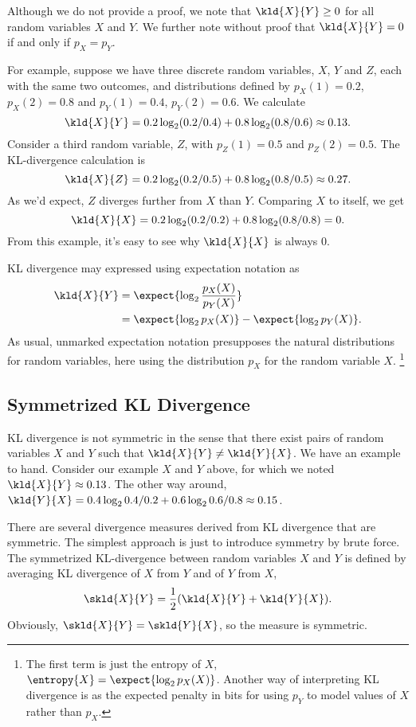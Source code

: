Although we do not provide a proof, we note that $\kld{X}{Y} \geq 0$
for all random variables $X$ and $Y$.  We further note without proof
that $\kld{X}{Y} = 0$ if and only if $p_X = p_Y$.

For example, suppose we have three discrete random variables, $X$, $Y$
and $Z$, each with the same two outcomes, and distributions defined by
$p_X(1) = 0.2$, $p_X(2) = 0.8$ and $p_Y(1) = 0.4$, $p_Y(2) = 0.6$.  We
calculate 
%
\[
\kld{X}{Y} = 0.2 \log_2 (0.2/0.4) + 0.8 \log_2 (0.8/0.6) \approx 0.13.
\]
%
Consider a third random variable, $Z$, with $p_Z(1) = 0.5$ and
$p_Z(2) = 0.5$.  The KL-divergence calculation is 
%
\[
\kld{X}{Z} = 0.2 \log_2 (0.2/0.5) + 0.8 \log_2 (0.8/0.5) \approx 0.27.
\]
As we'd expect, $Z$ diverges further from $X$ than $Y$.  
Comparing $X$ to itself, we get
%
\[
\kld{X}{X} = 0.2 \log_2 (0.2/0.2) + 0.8 \log_2(0.8/0.8) = 0.
\]  
%
From this example, it's easy to see why $\kld{X}{X}$ is always 0.

KL divergence may expressed using expectation notation as
%
\begin{align}
\kld{X}{Y} 
&= \expect{\log_2 \frac{p_X(X)}{p_Y(X)}}
\\
&= \expect{\log_2 p_X(X)} - \expect{\log_2 p_Y(X)}.
\end{align}
%
As usual, unmarked expectation notation presupposes the natural
distributions for random variables, here using the distribution $p_X$
for the random variable $X$.%
%
\footnote{The first term is just the entropy of $X$,
$\entropy{X} = \expect{\log_2 p_X(X)}$.  Another way of interpreting
KL divergence is as the expected penalty in bits for using $p_Y$ to
model values of $X$ rather than $p_X$.}

\subsection{Symmetrized KL Divergence}\label{section:stats-symmetrized-kl-divergence}

KL divergence is not symmetric in the sense that there exist pairs of
random variables $X$ and $Y$ such that $\kld{X}{Y} \neq \kld{Y}{X}$.
We have an example to hand.  Consider our example $X$ and $Y$ above,
for which we noted $\kld{X}{Y} \approx 0.13$.  The other way around,
$\kld{Y}{X} = 0.4 \log_2 0.4/0.2 + 0.6 \log_2 0.6/0.8 \approx 0.15$.

There are several divergence measures derived from KL divergence that
are symmetric.  The simplest approach is just to introduce symmetry
by brute force.  The symmetrized KL-divergence between random variables
$X$ and $Y$ is defined by averaging KL divergence of $X$ from $Y$
and of $Y$ from $X$,
%
\begin{equation}
\skld{X}{Y} = \frac{1}{2}(\kld{X}{Y} + \kld{Y}{X}).
\end{equation}
%
Obviously, $\skld{X}{Y} = \skld{Y}{X}$, so the measure is symmetric.


